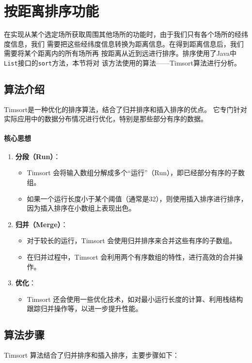 \documentclass{report}
\begin{document}
\section{按距离排序功能}
在实现从某个选定场所获取周围其他场所的功能时，由于我们只有各个场所的经纬度信息，我们
需要把这些经纬度信息转换为距离信息。在得到距离信息后，我们需要将某个距离内的所有场所再
按距离从近到远进行排序。排序使用了Java中\verb|List|接口的\verb|sort|方法，本节将对
该方法使用的算法——Timsort算法进行分析。
\subsection{算法介绍}
Timsort是一种优化的排序算法，结合了归并排序和插入排序的优点。
它专门针对实际应用中的数据分布情况进行优化，特别是那些部分有序的数据。
\paragraph{核心思想}
\begin{enumerate}
    \item \textbf{分段（Run）}：
    \begin{itemize}
        \item Timsort 会将输入数组分解成多个“运行”（Run），即已经部分有序的子数组。
        \item 如果一个运行长度小于某个阈值（通常是32），则使用插入排序进行排序，因为插入排序在小数组上表现出色。
    \end{itemize}

    \item \textbf{归并（Merge）}：
    \begin{itemize}
        \item 对于较长的运行，Timsort 会使用归并排序来合并这些有序的子数组。
        \item 在归并过程中，Timsort 会利用两个有序数组的特性，进行高效的合并操作。
    \end{itemize}

    \item \textbf{优化}：
    \begin{itemize}
        \item Timsort 还会使用一些优化技术，如对最小运行长度的计算、利用栈结构跟踪归并操作等，以进一步提升性能。
    \end{itemize}
\end{enumerate}
\subsection{算法步骤}
Timsort 算法结合了归并排序和插入排序，主要步骤如下：
\end{document}
